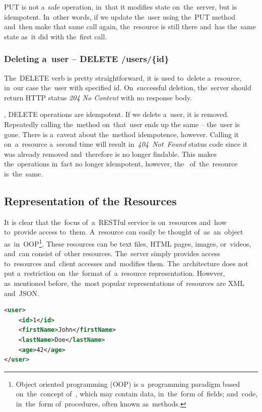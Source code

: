 PUT is not a~safe operation, in~that it modifies state on~the~server, but is
idempotent. In~other words, if we update the~user using the~PUT method and~then
make that same call again, the~resource is still there and~has the~same state 
as~it did with the~first call.

\subsubsection{Deleting a~user -- DELETE /users/\{id\}}
The~DELETE verb is pretty straightforward, it is used to~delete a~resource,
in~our case the~user with specified id. On~successful deletion, the~server
should return HTTP status \textit{204 No Content} with no response body.

, DELETE operations are idempotent. If we delete a~user, it
is removed. Repeatedly calling the~method on~that~user ends up the same --
the~user is gone. There is a~caveat about the~method idempotence, however.
Calling it on~a~resource a~second time will result in~\textit{404~Not~Found}
status code since it was already removed and~therefore is no longer findable. This makes
the~operations in~fact no longer idempotent, however, the~
of~the~resource is~the~same.

\subsection{Representation of the Resources}
It is clear that the~focus of~a~RESTful service is on~resources and~how
to~provide access to~them. A~resource can easily be thought of~as~an~object
as~in~OOP\footnote{Object oriented programming (OOP) is a~programming paradigm
based on~the~concept of~, which may contain data, in~the~form
of~fields; and~code, in~the~form of~procedures, often known as~methods.}. These
resources can be text files, HTML pages, images, or~videos, and~can consist
of~other resources. The~server simply provides access to~resources
and~client accesses and~modifies them. The~architecture does not put
a~restriction on~the~format of~a~resource representation. However,
as~mentioned before, the~most popular representations of~resources are XML
and~JSON.

\vspace{2mm}
\begin{lstlisting}[caption=A XML representation of~a~\textit{user} resource.,
label=XMLExample, language=XML]
<user>
	<id>1</id>
	<firstName>John</firstName>
	<lastName>Doe</lastName>
	<age>42</age>
</user>
\end{lstlisting}

